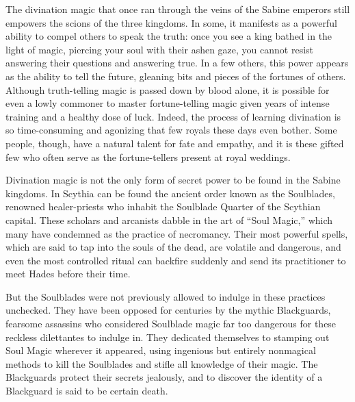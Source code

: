 \documentclass[blue]{Kos}
\begin{document}
The divination magic that once ran through the veins of the Sabine emperors still empowers the scions of the three kingdoms. In some, it manifests as a powerful ability to compel others to speak the truth: once you see a king bathed in the light of magic, piercing your soul with their ashen gaze, you cannot resist answering their questions and answering true. In a few others, this power appears as the ability to tell the future, gleaning bits and pieces of the fortunes of others. Although truth-telling magic is passed down by blood alone, it is possible for even a lowly commoner to master fortune-telling magic given years of intense training and a healthy dose of luck. Indeed, the process of learning divination is so time-consuming and agonizing that few royals these days even bother. Some people, though, have a natural talent for fate and empathy, and it is these gifted few who often serve as the fortune-tellers present at royal weddings.

Divination magic is not the only form of secret power to be found in the Sabine kingdoms. In Scythia can be found the ancient order known as the Soulblades, renowned healer-priests who inhabit the Soulblade Quarter of the Scythian capital. These scholars and arcanists dabble in the art of ``Soul Magic,'' which many have condemned as the practice of necromancy. Their most powerful spells, which are said to tap into the souls of the dead, are volatile and dangerous, and even the most controlled ritual can backfire suddenly and send its practitioner to meet Hades before their time. 

But the Soulblades were not previously allowed to indulge in these practices unchecked. They have been opposed for centuries by the mythic Blackguards, fearsome assassins who considered Soulblade magic far too dangerous for these reckless dilettantes to indulge in. They dedicated themselves to stamping out Soul Magic wherever it appeared, using ingenious but entirely nonmagical methods to kill the Soulblades and stifle all knowledge of their magic. The Blackguards protect their secrets jealously, and to discover the identity of a Blackguard is said to be certain death.
\end{document}
